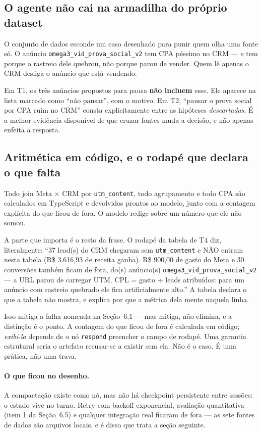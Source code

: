 \documentclass[10pt,twocolumn]{article}
\newcommand{\code}[1]{\texttt{\footnotesize #1}}
\begin{document}
\subsection{O agente não cai na armadilha do próprio dataset}

O conjunto de dados esconde um caso desenhado para punir quem olha uma fonte só. O anúncio
\code{omega3\_vid\_prova\_social\_v2} tem CPA péssimo no CRM --- e tem porque o rastreio dele
quebrou, não porque parou de vender. Quem lê apenas o CRM desliga o anúncio que está
vendendo.

Em T1, os três anúncios propostos para pausa \textbf{não incluem} esse. Ele aparece na lista
marcado como ``não pausar'', com o motivo. Em T2, ``pausar o prova social por CPA ruim no
CRM'' consta explicitamente entre as hipóteses \emph{descartadas}. É a melhor evidência
disponível de que cruzar fontes muda a decisão, e não apenas enfeita a resposta.

\subsection{Aritmética em código, e o rodapé que declara o que falta}

Todo join Meta $\times$ CRM por \code{utm\_content}, todo agrupamento e todo CPA são
calculados em TypeScript e devolvidos prontos ao modelo, junto com a contagem explícita do
que ficou de fora. O modelo redige sobre um número que ele não somou.

A parte que importa é o resto da frase. O rodapé da tabela de T4 diz, literalmente: ``37
lead(s) do CRM chegaram sem \code{utm\_content} e NÃO entram nesta tabela (R\$ 3.616,93 de
receita ganha). R\$ 900,00 de gasto do Meta e 30 conversões também ficam de fora, do(s)
anúncio(s) \code{omega3\_vid\_prova\_social\_v2} --- a URL parou de carregar UTM. CPL = gasto
$\div$ leads atribuídos: para um anúncio com rastreio quebrado ele fica artificialmente
alto.'' A tabela declara o que a tabela não mostra, e explica por que a métrica dela mente
naquela linha.

Isso mitiga a falha nomeada na Seção~6.1 --- mas mitiga, não elimina, e a distinção é o
ponto. A contagem do que ficou de fora é calculada em código; \emph{exibi-la} depende de o
nó \code{respond} preencher o campo de rodapé. Uma garantia estrutural seria o artefato
recusar-se a existir sem ela. Não é o caso. É uma prática, não uma trava.

\paragraph{O que ficou no desenho.} A compactação existe como nó, mas não há checkpoint
persistente entre sessões: o estado vive no turno. Retry com backoff exponencial, avaliação
quantitativa (item 1 da Seção~6.5) e qualquer integração real ficaram de fora --- as sete
fontes de dados são arquivos locais, e é disso que trata a seção seguinte.
\end{document}

